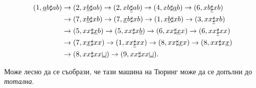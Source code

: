 \begin{example}
  \begin{align*}
    (1, \underline{a}b\sharp ab) & \to (2, x\underline{b}\sharp ab) \to (2,xb\underline{\sharp}ab) \to (4, xb\sharp\underline{a}b) \to (6, xb\underline{\sharp}xb)\\
    & \to (7, x\underline{b}\sharp xb) \to (7, \underline{x}b\sharp xb) \to (1, x\underline{b}\sharp xb) \to (3, xx\underline{\sharp}xb)\\
    & \to (5, xx\sharp\underline{x}b) \to (5, xx\sharp x\underline{b}) \to (6, xx\sharp\underline{x}x) \to (6, xx\underline{\sharp} xx)\\
    & \to (7, x\underline{x}\sharp xx) \to (1, xx\underline{\sharp} xx) \to (8, xx\sharp\underline{x}x) \to (8, xx\sharp x\underline{x})\\
    & \to (8, xx\sharp xx\underline{\sqcup}) \to (9,xx\sharp xx\underline{\sqcup}).
  \end{align*}

  Може лесно да се съобрази, че тази машина на Тюринг може да се допълни до {\em тотална}.
  
\end{example}

